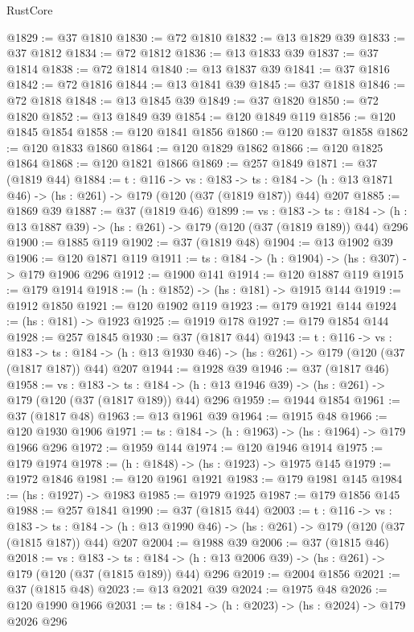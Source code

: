 \begin{lexlean}{RustCore}
\begin{coremodule}
@1829 := @37 @1810
@1830 := @72 @1810
@1832 := @13 @1829 @39
@1833 := @37 @1812
@1834 := @72 @1812
@1836 := @13 @1833 @39
@1837 := @37 @1814
@1838 := @72 @1814
@1840 := @13 @1837 @39
@1841 := @37 @1816
@1842 := @72 @1816
@1844 := @13 @1841 @39
@1845 := @37 @1818
@1846 := @72 @1818
@1848 := @13 @1845 @39
@1849 := @37 @1820
@1850 := @72 @1820
@1852 := @13 @1849 @39
@1854 := @120 @1849 @119
@1856 := @120 @1845 @1854
@1858 := @120 @1841 @1856
@1860 := @120 @1837 @1858
@1862 := @120 @1833 @1860
@1864 := @120 @1829 @1862
@1866 := @120 @1825 @1864
@1868 := @120 @1821 @1866
@1869 := @257 @1849
@1871 := @37 (@1819 @44)
@1884 := {t : @116} ->
  {vs : @183} ->
  {ts : @184} -> (h : @13 @1871 @46) -> (hs : @261) -> @179 (@120 (@37 (@1819 @187)) @44) @207
@1885 := @1869 @39
@1887 := @37 (@1819 @46)
@1899 := {vs : @183} ->
  {ts : @184} -> (h : @13 @1887 @39) -> (hs : @261) -> @179 (@120 (@37 (@1819 @189)) @44) @296
@1900 := @1885 @119
@1902 := @37 (@1819 @48)
@1904 := @13 @1902 @39
@1906 := @120 @1871 @119
@1911 := {ts : @184} -> (h : @1904) -> (hs : @307) -> @179 @1906 @296
@1912 := @1900 @141
@1914 := @120 @1887 @119
@1915 := @179 @1914
@1918 := (h : @1852) -> (hs : @181) -> @1915 @144
@1919 := @1912 @1850
@1921 := @120 @1902 @119
@1923 := @179 @1921 @144
@1924 := (hs : @181) -> @1923
@1925 := @1919 @178
@1927 := @179 @1854 @144
@1928 := @257 @1845
@1930 := @37 (@1817 @44)
@1943 := {t : @116} ->
  {vs : @183} ->
  {ts : @184} -> (h : @13 @1930 @46) -> (hs : @261) -> @179 (@120 (@37 (@1817 @187)) @44) @207
@1944 := @1928 @39
@1946 := @37 (@1817 @46)
@1958 := {vs : @183} ->
  {ts : @184} -> (h : @13 @1946 @39) -> (hs : @261) -> @179 (@120 (@37 (@1817 @189)) @44) @296
@1959 := @1944 @1854
@1961 := @37 (@1817 @48)
@1963 := @13 @1961 @39
@1964 := @1915 @48
@1966 := @120 @1930 @1906
@1971 := {ts : @184} -> (h : @1963) -> (hs : @1964) -> @179 @1966 @296
@1972 := @1959 @144
@1974 := @120 @1946 @1914
@1975 := @179 @1974
@1978 := (h : @1848) -> (hs : @1923) -> @1975 @145
@1979 := @1972 @1846
@1981 := @120 @1961 @1921
@1983 := @179 @1981 @145
@1984 := (hs : @1927) -> @1983
@1985 := @1979 @1925
@1987 := @179 @1856 @145
@1988 := @257 @1841
@1990 := @37 (@1815 @44)
@2003 := {t : @116} ->
  {vs : @183} ->
  {ts : @184} -> (h : @13 @1990 @46) -> (hs : @261) -> @179 (@120 (@37 (@1815 @187)) @44) @207
@2004 := @1988 @39
@2006 := @37 (@1815 @46)
@2018 := {vs : @183} ->
  {ts : @184} -> (h : @13 @2006 @39) -> (hs : @261) -> @179 (@120 (@37 (@1815 @189)) @44) @296
@2019 := @2004 @1856
@2021 := @37 (@1815 @48)
@2023 := @13 @2021 @39
@2024 := @1975 @48
@2026 := @120 @1990 @1966
@2031 := {ts : @184} -> (h : @2023) -> (hs : @2024) -> @179 @2026 @296

\end{coremodule}
\end{lexlean}
